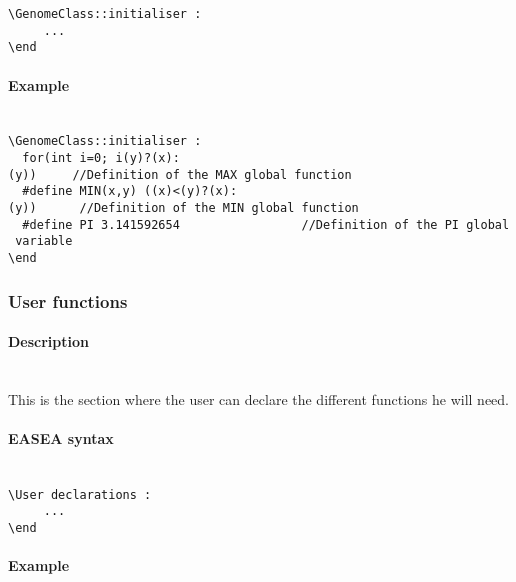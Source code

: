 \documentclass{book}
\begin{document}
\texttt{\textbackslash{}GenomeClass::initialiser~:}\\\texttt{~~~~~...}\\\texttt{\textbackslash{}end}

\paragraph{Example}\label{example}
~\\

\texttt{\textbackslash{}GenomeClass::initialiser~:}\\\texttt{~~for(int~i=0;~i}\texttt{(y)?(x):(y))~~~~~//Definition~of~the~MAX~global~function}\\\texttt{~~\#define~MIN(x,y)~((x)\textless{}(y)?(x):(y))~~~~~~//Definition~of~the~MIN~global~function}\\\texttt{~~\#define~PI~3.141592654~~~~~~~~~~~~~~~~~//Definition~of~the~PI~global~variable}\\\texttt{\textbackslash{}end}

\subsubsection{User functions}\label{user-functions}

\paragraph{Description}\label{description-1}
~\\

This is the section where the user can declare the different functions
he will need.

\paragraph{EASEA syntax}\label{easea-syntax-1}
~\\

\texttt{\textbackslash{}User~declarations~:}\\\texttt{~~~~~...}\\\texttt{\textbackslash{}end}

\paragraph{Example}\label{example-1}
~\\
\end{document}
